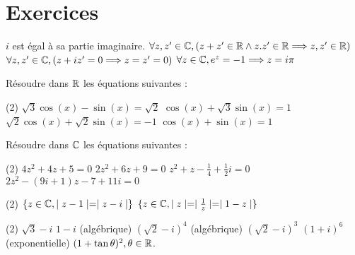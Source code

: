 \section{Exercices}



\begin{exercise}[subtitle= Assertions justes ou fausses ?, difficulty=*]
		\begin{tasks} 
			\task $i$ est égal à sa partie imaginaire. 
			\task $\forall z,z' \in \mathbb{C}, ( z+z' \in \mathbb{R} \wedge z.z' \in \mathbb{R} \Longrightarrow z,z' \in \mathbb{R})$
			\task $\forall z,z' \in \mathbb{C}, (z+iz' = 0 \Longrightarrow z = z' = 0)$
			\task $\forall z \in \mathbb{C}, e^z = -1 \Longrightarrow z = i\pi$
		\end{tasks}
\end{exercise}


\begin{exercise}[subtitle= Résolution d'équations dans $\RR$, difficulty=*]
	Résoudre dans $\RR$ les équations suivantes : 
	\begin{tasks}(2) 
		\task $\sqrt{3} \cos(x) - \sin(x) = \sqrt{2}$
	    \task $\cos(x) + \sqrt{3}\sin(x) = 1$
	    \task $\sqrt{2}\cos(x) + \sqrt{2}\sin(x) = -1$
	    \task $\cos(x) + \sin(x) = 1$
	\end{tasks}
\end{exercise}

\begin{exercise}[subtitle= Résolution d'équations dans $\CC$, difficulty=***]
	Résoudre dans $\CC$ les équations suivantes : 
	\begin{tasks}(2) 
		\task $4z^2 + 4z + 5 = 0$
		\task $2z^2 + 6z + 9= 0$
		\task $z^2 + z - \frac{1}{4} +\frac{1}{2}i = 0$
		\task $2z^2-(9i+1)z-7+11i=0$
	\end{tasks}
\end{exercise}


\begin{exercise}[subtitle= Déterminer les ensembles, difficulty=**]
	\begin{tasks}(2) 
		\task $\{z \in \mathbb{C}, \mid z-1 \mid = \mid z - i\mid\}$
		\task $\{z \in \mathbb{C}, \mid z \mid = \mid \frac{1}{z}\mid = \mid 1 -z \mid\}$
	\end{tasks}
\end{exercise}


\begin{exercise}[subtitle=Transformer le nombre complexe sous une autre forme, difficulty=*]
	\begin{tasks}(2)
		\task $\sqrt{3} - i$ 
		\task $1 - i$
		\task (algébrique) $(\sqrt{2} - i)^4$
		\task (algébrique) $(\sqrt{2} - i)^3$
		\task $(1+i)^6$
		\task (exponentielle)	$ (1 + \tan{\theta})^2, \theta \in \mathbb{R}$.  
	\end{tasks}
\end{exercise}

